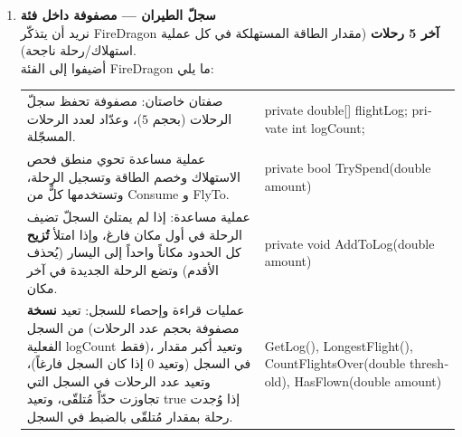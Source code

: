 \documentclass[14pt]{extarticle}
\begin{document}
\begin{enumerate}[label=\textbf{تمرين \arabic*:}, wide=0pt, leftmargin=*, itemsep=2.2em]
    \vspace{2em}
    \noindent \textbf{الفحص في \textenglish{Main}:}
    \begin{itemize}
        \item أنشئوا تنينين (الأول بالعملية البنائية الأولى والثاني بالثانية بجمر طوارئ $50$) واطبعوهما.
        \item عبّئوا الأول بـ $100$ وحاولوا استهلاك $30$، ثم $80$ (تفشل)، ثم $-5$ (تفشل)، وللتنين الثاني جرّبوا استهلاك $40$ ثم $20$.
        \item اختبروا \textenglish{SetEmberReserve} و \textenglish{SetLair} و \textenglish{FlyTo}، وعدّلوا كائن \textenglish{Coordinates} الأصلي بعد إنشاء التنين للتأكد من أن عرين التنين لم يتأثر بفضل العملية البنائية الناسخة.
    \end{itemize}

\clearpage

    \item \textbf{سجلّ الطيران — مصفوفة داخل فئة} \\
    نريد أن يتذكّر \textenglish{FireDragon} \textbf{آخر 5 رحلات} (مقدار الطاقة المستهلكة في كل عملية استهلاك/رحلة ناجحة). \\
    أضيفوا إلى الفئة \textenglish{FireDragon} ما يلي:

    {\centering
    \renewcommand{\arraystretch}{1.2}
    \small
    \begin{tabular}{|>{\raggedleft\arraybackslash}p{}|>{\raggedright\arraybackslash}p{}|}
    \hline
    \multicolumn{2}{|c|}{\textbf{إضافات إلى الفئة: \textenglish{FireDragon}}} \\
    \hline
    صفتان خاصتان: مصفوفة تحفظ سجلّ الرحلات (بحجم $5$)، وعدّاد لعدد الرحلات المسجّلة. & \textenglish{private double[] flightLog;} \newline \textenglish{private int logCount;} \\
    \hline
    عملية مساعدة تحوي منطق فحص الاستهلاك وخصم الطاقة وتسجيل الرحلة، وتستخدمها كلٌّ من \textenglish{Consume} و \textenglish{FlyTo}. & \textenglish{private bool TrySpend(double amount)} \\
    \hline
    عملية مساعدة: إذا لم يمتلئ السجلّ تضيف الرحلة في أول مكان فارغ، وإذا امتلأ \textbf{تُزيح} كل الحدود مكاناً واحداً إلى اليسار (يُحذف الأقدم) وتضع الرحلة الجديدة في آخر مكان. & \textenglish{private void AddToLog(double amount)} \\
    \hline
    عمليات قراءة وإحصاء للسجل: تعيد \textbf{نسخة} من السجل (مصفوفة بحجم عدد الرحلات الفعلية \textenglish{logCount} فقط)، وتعيد أكبر مقدار في السجل (وتعيد $0$ إذا كان السجل فارغاً)، وتعيد عدد الرحلات في السجل التي تجاوزت حدّاً مُتلقّى، وتعيد \textenglish{true} إذا وُجدت رحلة بمقدار مُتلقّى بالضبط في السجل. & \textenglish{GetLog(), LongestFlight(),} \newline \textenglish{CountFlightsOver(double threshold), HasFlown(double amount)} \\
    \hline
    \end{tabular}
    \par} %


\end{enumerate}
\end{document}
